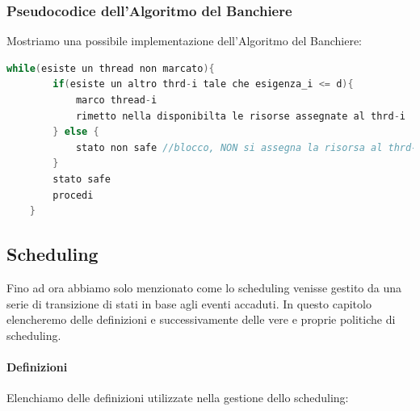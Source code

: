 \documentclass{article}
\begin{document}
\newpage

\subsubsection{Pseudocodice dell'Algoritmo del Banchiere}

Mostriamo una possibile implementazione dell'Algoritmo del Banchiere:

\vspace*{10px}

\begin{lstlisting}[language = C]
    while(esiste un thread non marcato){
        if(esiste un altro thrd-i tale che esigenza_i <= d){
            marco thread-i
            rimetto nella disponibilta le risorse assegnate al thrd-i
        } else {
            stato non safe //blocco, NON si assegna la risorsa al thrd-i
        }
        stato safe
        procedi
    }
\end{lstlisting}

\subsection{Scheduling}

Fino ad ora abbiamo solo menzionato come lo scheduling venisse gestito da una serie di transizione di stati in base agli eventi accaduti. In questo capitolo
elencheremo delle definizioni e successivamente delle vere e proprie politiche di scheduling.

\paragraph{Definizioni} Elenchiamo delle definizioni utilizzate nella gestione dello scheduling:
\end{document}
